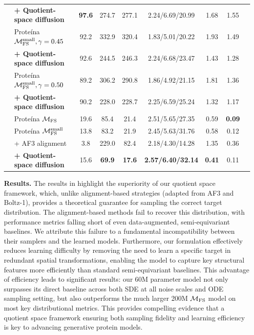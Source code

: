\documentclass{article} %
\begin{document}
\begin{table}[t]
{\begin{tabular}{cl@{}ccccccc}
& \textbf{+ Quotient-space diffusion} & \textbf{97.6} & 274.7 & 277.1 & 2.24/6.69/20.99 & 1.68 & 1.55 \\
& Prote\'ina $\mathcal{M}_{\text{FS}}^{\text{small}}, \gamma=0.45$ & 92.2 & 332.9 & 320.4 & 1.83/5.01/20.22 & 1.93 & 1.49 \\
& \textbf{+ Quotient-space diffusion} & 92.6 & 244.5 & 246.3 & 2.24/6.68/23.47 & 1.43 & 1.28 \\
& Prote\'ina $\mathcal{M}_{\text{FS}}^{\text{small}}, \gamma=0.50$ & 89.2 & 306.2 & 290.8 & 1.86/4.92/21.15 & 1.81 & 1.36 \\
& \textbf{+ Quotient-space diffusion} & 90.2 & 228.0 & 228.7 & 2.25/6.59/25.24 & 1.32 & 1.17 \\
\midrule
& Prote\'ina $\mathcal{M}_{\text{FS}}$ & 19.6 & 85.4 & 21.4 & 2.51/5.65/27.35 & 0.59 & \textbf{0.09} \\
& Prote\'ina $\mathcal{M}_{\text{FS}}^{\text{small}}$ & 13.8 & 83.2 & 21.9 & 2.45/5.63/31.76 & 0.58 & 0.12 \\
& + AF3 alignment & 3.8 & 229.0 & 82.4 & 2.18/4.30/14.28 & 1.35 & 0.36 \\
& \textbf{+ Quotient-space diffusion} & 15.6 & \textbf{69.9} & \textbf{17.6} & \textbf{2.57/6.40/32.14} & \textbf{0.41} & 0.11 \\
\bottomrule
\end{tabular}%
}
\vspace{-10pt}
\end{table}

\textbf{Results.}
The results in  highlight the superiority of our quotient space framework, which, unlike alignment-based strategies (adapted from AF3 and Boltz-1), provides a theoretical guarantee for sampling the correct target distribution. The alignment-based methods fail to recover this distribution, with performance metrics falling short of even data-augmented, semi-equivariant baselines. We attribute this failure to a fundamental incompatibility between their samplers and the learned models.
Furthermore, our formulation effectively reduces learning difficulty by removing the need to learn a specific target in redundant spatial transformations, enabling the model to capture key structural features more efficiently than standard semi-equivariant baselines. This advantage of efficiency leads to significant results: our 60M parameter model not only surpasses its direct baseline across both SDE at all noise scales and ODE sampling setting, but also outperforms the much larger 200M $\mathcal{M}_{\text{FS}}$ model on most key distributional metrics. This provides compelling evidence that a quotient space framework ensuring both sampling fidelity and learning efficiency is key to advancing generative protein models.
\end{document}

